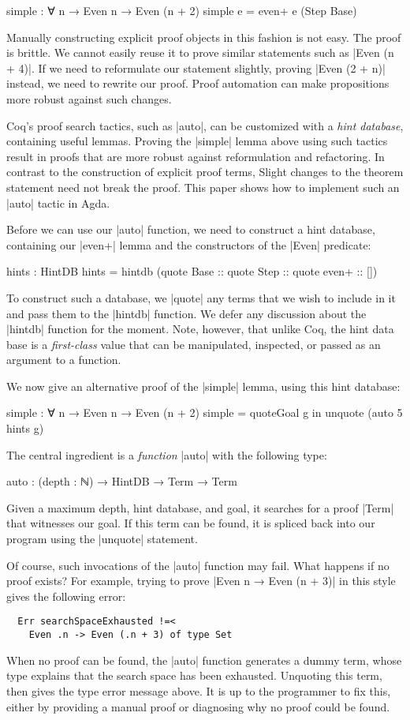 \documentclass[preprint]{sigplanconf}
\begin{document}
\begin{code}
  simple : ∀ {n} → Even n → Even (n + 2)
  simple e = even+ e (Step Base)
\end{code}
Manually constructing explicit proof objects
in this fashion is not easy. The proof is brittle. We cannot easily
reuse it to prove similar statements such as |Even (n + 4)|. If we
need to reformulate our statement slightly, proving |Even (2 + n)|
instead, we need to rewrite our proof. Proof automation can make
propositions more robust against such changes.

Coq's proof search tactics, such as |auto|, can be customized with a
\emph{hint database}, containing useful lemmas. Proving the |simple|
lemma above using such tactics result in proofs that are more robust
against reformulation and refactoring. In contrast to the construction
of explicit proof terms, Slight changes to the theorem statement need
not break the proof. This paper shows how to implement such an |auto|
tactic in Agda.

Before we can use our |auto| function, we need to construct a hint
database, containing our |even+| lemma and the constructors of the
|Even| predicate:
\begin{code}
  hints : HintDB
  hints = hintdb
    (quote Base :: quote Step :: quote even+ :: [])
\end{code}
To construct such a database, we |quote| any terms that we wish to
include in it and pass them to the |hintdb| function.  We
defer any discussion about the |hintdb| function for the moment. Note,
however, that unlike Coq, the hint data base is a \emph{first-class}
value that can be manipulated, inspected, or passed as an argument to
a function.

We now give an alternative proof of the |simple| lemma, using this
hint database:
\begin{code}
  simple : ∀ {n} → Even n → Even (n + 2)
  simple = quoteGoal g in unquote (auto 5 hints g)
\end{code}
The central ingredient is a \emph{function} |auto| with the following
type:
\begin{code}
  auto : (depth : ℕ) → HintDB → Term → Term
\end{code}
Given a maximum depth, hint database, and goal, it searches for a
proof |Term| that witnesses our goal. If this term can be found, it is
spliced back into our program using the |unquote| statement.

Of course, such invocations of the |auto| function may fail. What
happens if no proof exists? For example, trying to prove |Even n →
Even (n + 3)| in this style gives the following error:
\begin{verbatim}
  Err searchSpaceExhausted !=<
    Even .n -> Even (.n + 3) of type Set
\end{verbatim}
When no proof can be found, the |auto| function generates a dummy
term, whose type explains that the search space has been
exhausted. Unquoting this term, then gives the type error message
above. It is up to the programmer to fix this, either by providing a
manual proof or diagnosing why no proof could be found.
\end{document}
